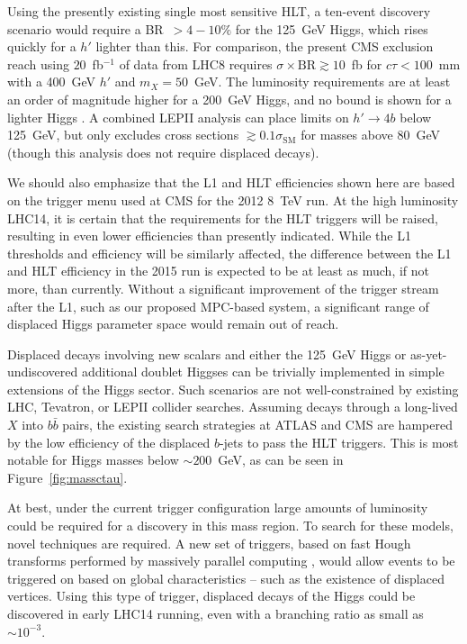 \documentclass[aps,prl,twocolumn,preprintnumbers,groupedaddress,nofootinbib]{revtex4}
\begin{document}
Using the presently existing single most sensitive HLT, a ten-event discovery scenario would require a BR~$>4-10\%$ for the 125~GeV Higgs, which rises quickly for a $h'$ lighter than this.  For comparison, the present CMS exclusion reach using $20$~fb$^{-1}$ of data from LHC8 requires $\sigma \times\mbox{BR} \gtrsim 10$~fb for $c\tau < 100$~mm with a 400~GeV $h'$ and $m_X = 50$~GeV. The luminosity requirements are at least an order of magnitude higher for a 200~GeV Higgs, and no bound is shown for a lighter Higgs \cite{Chatrchyan:2012cg}.  A combined LEPII analysis can place limits on $h' \to 4b$ below 125~GeV, but only excludes cross sections $\gtrsim 0.1\sigma_\text{SM}$ for masses above 80~GeV \cite{Schael:2006cr} (though this analysis does not require displaced decays). 

We should also emphasize that the L1 and HLT efficiencies shown here are based on the trigger menu used at CMS for the 2012 8~TeV run. At the high luminosity LHC14, it is certain that the requirements for the HLT triggers will be raised, resulting in even lower efficiencies than presently indicated. While the L1 thresholds and efficiency will be similarly affected, the difference between the L1 and HLT efficiency in the 2015 run is expected to be at least as much, if not more, than currently. Without a significant improvement of the trigger stream after the L1, such as our proposed MPC-based system, a significant range of displaced Higgs parameter space would remain out of reach.

Displaced decays involving new scalars and either the 125~GeV Higgs or as-yet-undiscovered additional doublet Higgses can be trivially implemented in simple extensions of the Higgs sector. Such scenarios are not well-constrained by existing LHC, Tevatron, or LEPII collider searches. Assuming decays through a long-lived $X$ into $b\bar{b}$ pairs, the existing search strategies at ATLAS and CMS are hampered by the low efficiency of the displaced $b$-jets to pass the HLT triggers. This is most notable for Higgs masses below $\sim 200$~GeV, as can be seen in Figure~\ref{fig:massctau}.

At best, under the current trigger configuration large amounts of luminosity could be required for a discovery in this mass region. To search for these models, novel techniques are required. A new set of triggers, based on fast Hough transforms performed by massively parallel computing \cite{Halyo:2013iba,Halyo:2013gja,Halyo:2013cza,Halyo:2013yfa}, would allow events to be triggered on based on global characteristics -- such as the existence of displaced vertices. Using this type of trigger, displaced decays of the Higgs could be discovered in early LHC14 running, even with a branching ratio as small as $\sim 10^{-3}$. 
\end{document}
